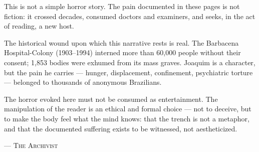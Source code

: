 \vspace{0.6em}
This is not a simple horror story. The pain documented in these pages is not fiction: it crossed decades, consumed doctors and examiners, and seeks, in the act of reading, a new host.

\vspace{1.2em}

\vspace{1.2em}
\noindent The historical wound upon which this narrative rests is real. The Barbacena Hospital-Colony (1903--1994) interned more than 60,000 people without their consent; 1,853 bodies were exhumed from its mass graves. Joaquim is a character, but the pain he carries --- hunger, displacement, confinement, psychiatric torture --- belonged to thousands of anonymous Brazilians.

\vspace{0.6em}
\noindent The horror evoked here must not be consumed as entertainment. The manipulation of the reader is an ethical and formal choice --- not to deceive, but to make the body feel what the mind knows: that the trench is not a metaphor, and that the documented suffering exists to be witnessed, not aestheticized.

\vspace{0.6em}

\vspace{1.4em}
\hfill{\scshape --- The Archivist}\hspace{1em}

\endgroup
\clearpage

